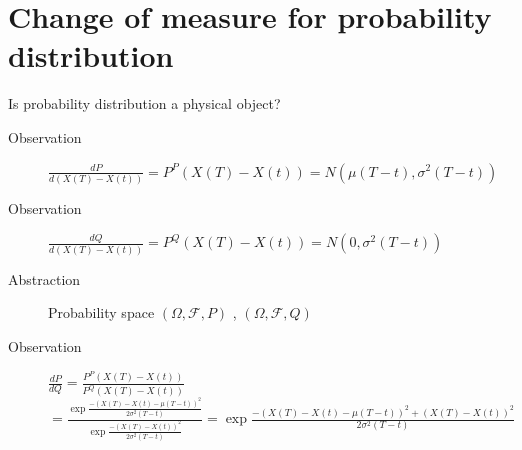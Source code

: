 \documentclass{article}
\begin{document}
\section{Change of measure for probability distribution }
Is probability distribution a physical object?
\begin{description}
    \item[Observation] $\frac{dP}{d(X(T)-X(t))} = P^P(X(T)-X(t)) = N(\mu (T-t), \sigma^2 (T-t))$
    \item[Observation] $\frac{dQ}{d(X(T)-X(t))} = P^Q(X(T)-X(t)) = N(0, \sigma^2 (T-t))$
    \item[Abstraction] Probability space $(\Omega, \mathcal{F}, P)$ ,  $(\Omega, \mathcal{F}, Q)$%
    \item[Observation] $\frac{dP}{dQ} = \frac{P^P(X(T)-X(t))}{P^Q(X(T)-X(t))} $\\
          $= \frac{\exp \frac{-(X(T)-X(t)-\mu (T-t))^2}{2\sigma^2 (T-t)}}{\exp \frac{-(X(T)-X(t))^2}{2\sigma^2 (T-t)}} = \exp \frac{-(X(T)-X(t)-\mu (T-t))^2+(X(T)-X(t))^2}{2\sigma^2 (T-t)}$ %

\end{description}
\end{document}
